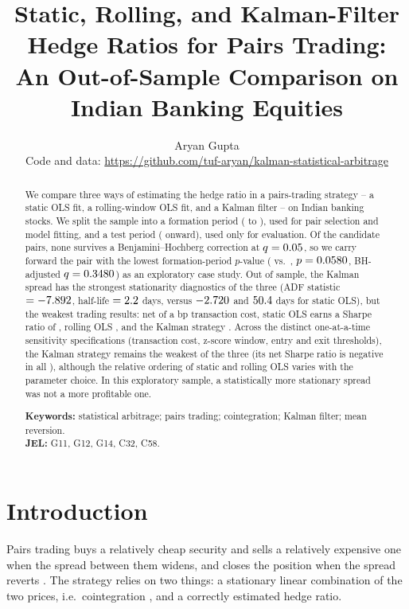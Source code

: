 \documentclass[11pt,a4paper]{article}
\title{\textbf{Static, Rolling, and Kalman-Filter Hedge Ratios for Pairs Trading:\\
An Out-of-Sample Comparison on Indian Banking Equities}}
\author{Aryan Gupta \\ \small Code and data: \url{https://github.com/tuf-aryan/kalman-statistical-arbitrage}}
\date{}
\begin{document}
\maketitle

\begin{abstract}
\noindent
We compare three ways of estimating the hedge ratio in a pairs-trading strategy -- a static OLS fit, a rolling-window OLS fit, and a Kalman filter -- on \NTickers{} Indian banking stocks. We split the sample into a formation period (\DataStart{} to \FormationEnd{}), used for pair selection and model fitting, and a test period (\TestStart{} onward), used only for evaluation. Of the \NPairs{} candidate pairs, none survives a Benjamini--Hochberg correction at $q=0.05{}$, so we carry forward the pair with the lowest formation-period $p$-value (\PairY{} vs.\ \PairX{}, $p=0.0580{}$, BH-adjusted $q=0.3480{}$) as an exploratory case study. Out of sample, the Kalman spread has the strongest stationarity diagnostics of the three (ADF statistic $=-7.892{}$, half-life $=2.2{}$ days, versus $-2.720{}$ and $50.4{}$ days for static OLS), but the weakest trading results: net of a \CostBps{} bp transaction cost, static OLS earns a Sharpe ratio of \NetSharpeStatic{}, rolling OLS \NetSharpeRolling{}, and the Kalman strategy \NetSharpeKalman{}. Across the \SensNSpecs{} distinct one-at-a-time sensitivity specifications (transaction cost, z-score window, entry and exit thresholds), the Kalman strategy remains the weakest of the three (its net Sharpe ratio is negative in all \SensKalmanNeg{}), although the relative ordering of static and rolling OLS varies with the parameter choice. In this exploratory sample, a statistically more stationary spread was not a more profitable one.

\medskip
\noindent\textbf{Keywords:} statistical arbitrage; pairs trading; cointegration; Kalman filter; mean reversion.\\
\textbf{JEL:} G11, G12, G14, C32, C58.
\end{abstract}

\section{Introduction}

Pairs trading buys a relatively cheap security and sells a relatively expensive one when the spread between them widens, and closes the position when the spread reverts \citep{gatev2006pairs}. The strategy relies on two things: a stationary linear combination of the two prices, i.e.\ cointegration \citep{engle1987co}, and a correctly estimated hedge ratio.
\end{document}
